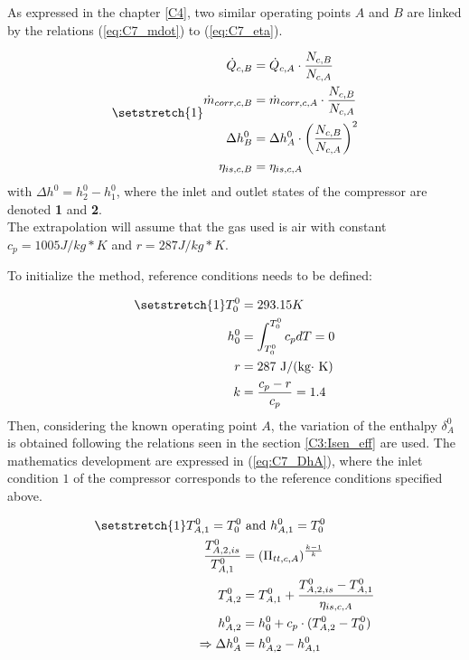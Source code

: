 As expressed in the chapter \ref{C4}, two similar operating points $A$ and $B$ are linked by the relations (\ref{eq:C7_mdot}) to (\ref{eq:C7_eta}). 

\begin{subequations}
\setstretch{1}
\begin{align}
    \dot{Q}_{c,B} &= \dot{Q}_{c,A} \cdot \frac{N_{c,B}}{N_{c,A}}\nonumber\\
    \dot{m}_{corr,c,B} &= \dot{m}_{corr,c,A} \cdot \frac{N_{c,B}}{N_{c,A}}\label{eq:C7_mdot}\\
    \Delta h_{B}^0 &= \Delta h_{A}^0 \cdot \left(\frac{N_{c,B}}{N_{c,A}}\right)^2 \label{eq:C7_Dh}\\
    \eta_{is,c,B} &= \eta_{is,c,A} \label{eq:C7_eta}
\end{align}
\end{subequations}
with $\Delta h^0 = h_{2}^0 - h_{1}^0$, where the inlet and outlet states of the compressor are denoted \textbf{1} and \textbf{2}.\\

The extrapolation will assume that the gas used is air with constant
$c_p=1005 J/kg*K$ and $r = 287 J/kg*K$. 

To initialize the method, reference conditions needs to be defined:

\begin{align*}
    \setstretch{1}
    T_{0}^0 & = 293.15K\\
    h_{0}^0 & = \int_{T_{0}^0}^{T_{0}^0} c_p dT = 0\\
    r & = 287 \text{ J/(kg$\cdot$ K)}\\
    k &= \frac{c_p - r}{c_p} = 1.4
\end{align*}
Then, considering the known operating point $A$, the variation of the enthalpy $\delta_{A}^0$ is obtained  following the relations seen in the section \ref{C3:Isen_eff} are used. The mathematics development are expressed in (\ref{eq:C7_DhA}), where the inlet condition $1$ of the compressor corresponds to the reference conditions specified above.

\begin{align}
\setstretch{1}
    T_{A,1}^0 = T_{0}^0 &\text{ and } h_{A,1}^0 = T_{0}^0\nonumber\\
    \frac{T_{A,2,is}^0}{T_{A,1}^0} &= \left(\Pi_{tt,c,A}\right)^{\frac{k-1}{k}}\nonumber\\
    T_{A,2}^0 &= T_{A,1}^0 + \frac{T_{A,2,is}^0 - T_{A,1}^0}{\eta_{is,c,A}}\label{eq:C7_DhA}\\
    h_{A,2}^0 &= h_{0}^0 + c_p\cdot (T_{A,2}^0 - T_{0}^0)\nonumber\\
    \Rightarrow \Delta h_A^0 &= h_{A,2}^0  - h_{A,1}^0\nonumber
\end{align}

